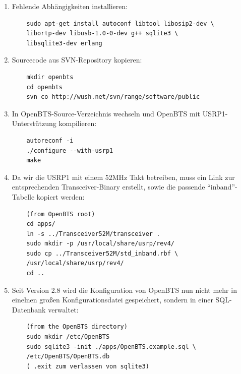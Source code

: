 \begin{enumerate}
	\item Fehlende Abhängigkeiten installieren:
	\begin{verbatim}
	sudo apt-get install autoconf libtool libosip2-dev \
	libortp-dev libusb-1.0-0-dev g++ sqlite3 \
	libsqlite3-dev erlang
	\end{verbatim}
	\item Sourcecode aus SVN-Repository kopieren:
	\begin{verbatim}
	mkdir openbts
	cd openbts
	svn co http://wush.net/svn/range/software/public
	\end{verbatim}
	\item In OpenBTS-Source-Verzeichnis wechseln und OpenBTS mit USRP1-Unterstützung kompilieren:
	\begin{verbatim}
	autoreconf -i
	./configure --with-usrp1
	make
	\end{verbatim}
	\item Da wir die USRP1 mit einem 52MHz Takt betreiben, muss ein Link zur entsprechenden Transceiver-Binary erstellt, sowie die passende "`inband"'-Tabelle kopiert werden:
	\begin{verbatim}
	(from OpenBTS root)
	cd apps/
	ln -s ../Transceiver52M/transceiver .
	sudo mkdir -p /usr/local/share/usrp/rev4/
	sudo cp ../Transceiver52M/std_inband.rbf \
	/usr/local/share/usrp/rev4/
	cd ..
	\end{verbatim}
	\item Seit Version 2.8 wird die Konfiguration von OpenBTS nun nicht mehr in einelnen großen Konfigurationsdatei gespeichert, sondern in einer SQL-Datenbank verwaltet:
	\begin{verbatim}
	(from the OpenBTS directory)
	sudo mkdir /etc/OpenBTS
	sudo sqlite3 -init ./apps/OpenBTS.example.sql \
	/etc/OpenBTS/OpenBTS.db
	( .exit zum verlassen von sqlite3)
	\end{verbatim}
\end{enumerate}

